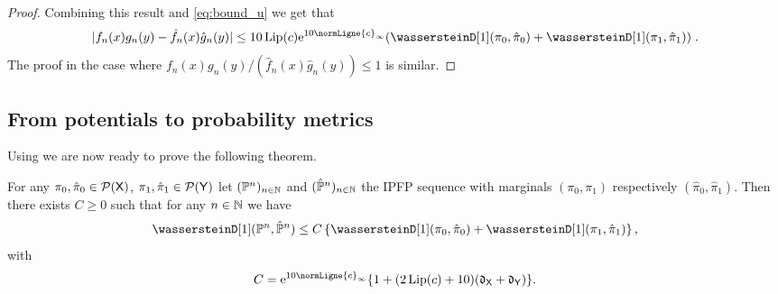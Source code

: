 \documentclass[11pt,a4paper]{article}
\begin{document}
\begin{proof}
Combining this result and \eqref{eq:bound_u} we get that
\begin{equation}
  \absLigne{f_n(x)g_n(y) - \hat{f}_n(x) \hat{g}_n(y)} \leq 10 \Lip(c) \rme^{10 \normLigne{c}_\infty} (\wassersteinD[1](\pi_0, \hat{\pi}_0) + \wassersteinD[1](\pi_1, \hat{\pi}_1) ) \eqsp .
\end{equation}
The proof in the case where $f_n(x)g_n(y)/(\hat{f}_n(x)\hat{g}_n(y)) \leq 1$ is similar.
\end{proof}
\subsection{From potentials to probability metrics}
\label{sec:from-potent-prob}

Using  we are now ready to prove the following theorem.

\begin{theorem}
  \label{thm:stability_ipfp2}
  For any $\pi_0, \hat{\pi}_0 \in \mathcal{P}(\mathsf{X})$,
  $\pi_1, \hat{\pi}_1 \in \mathcal{P}(\mathsf{Y})$ let $(\mathbb{P}^{n})_{n\in \mathbb{N}}$ and
  $(\hat{\mathbb{P}}^{n})_{n\in \mathbb{N}}$ the IPFP sequence with marginals
  $(\pi_0, \pi_1)$ respectively $(\hat{\pi}_0, \hat{\pi}_1)$. Then there exists
  $C \geq 0$ such that for any $n \in \mathbb{N}$ we have
  \begin{equation}
    \wassersteinD[1](\Pbb^n, \hat{\Pbb}^n) \leq C \defEns{\wassersteinD[1](\pi_0, \hat{\pi}_0) + \wassersteinD[1](\pi_1, \hat{\pi}_1)},
  \end{equation}
  with
  \begin{equation}
    C = \rme^{10 \normLigne{c}_\infty} \{1 + (2\Lip(c)+10) (\diam_\msx + \diam_\msy) \}.
  \end{equation}
\end{theorem}
\end{document}
